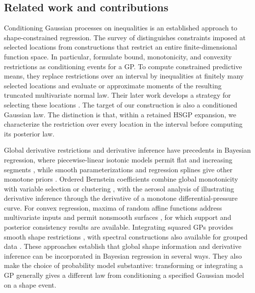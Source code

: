 \subsection{Related work and contributions}

Conditioning Gaussian processes on inequalities is an established
approach to shape-constrained regression. The survey of
\citet{swiler2020survey} distinguishes constraints imposed at selected
locations from constructions that restrict an entire finite-dimensional
function space. In particular, \citet{daveiga2012inequality} formulate
bound, monotonicity, and convexity restrictions as conditioning events
for a GP. To compute constrained predictive means, they replace
restrictions over an interval by inequalities at finitely many selected
locations and evaluate or approximate moments of the resulting
truncated multivariate normal law. Their later work develops a strategy
for selecting these locations \citep{daveiga2020linear}. The target of
our construction is also a conditioned Gaussian law. The distinction
is that, within a retained HSGP expansion, we characterize the
restriction over every location in the interval before computing its
posterior law.

Global derivative restrictions and derivative inference have precedents
in Bayesian regression, where piecewise-linear isotonic models permit
flat and increasing segments \citep{neelon2004isotonic}, while smooth
parameterizations and regression splines give other monotone priors
\citep{shively2009monotone}. Ordered Bernstein coefficients combine
global monotonicity with variable selection or clustering
\citep{curtis2011bernstein,wilson2020monotone}, with the aerosol analysis
of \citet{wilson2020monotone} illustrating derivative inference through
the derivative of a monotone differential-pressure curve.
For convex regression, maxima of random affine functions address
multivariate inputs and permit nonsmooth surfaces
\citep{hannah2011convex}, for which support and posterior consistency
results are available. Integrating squared GPs provides smooth
shape restrictions \citep{lenk2017shape}, with spectral constructions
also available for grouped data \citep{lenk2024hierarchical}.
These approaches establish that global shape information and
derivative inference can be incorporated in Bayesian regression in
several ways. They also make the choice of probability model
substantive: transforming or integrating a GP generally gives a
different law from conditioning a specified Gaussian model on a
shape event.

